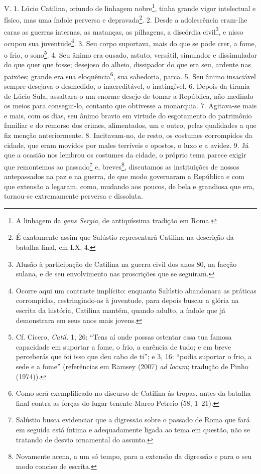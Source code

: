 V. 1. Lúcio Catilina, oriundo de linhagem nobre\footnote{A linhagem da
\emph{gens Sergia}, de antiquíssima tradição em Roma.}, tinha grande vigor
intelectual e físico, mas uma índole perversa e depravada\footnote{É exatamente
assim que Salústio representará Catilina na descrição da batalha final, em LX,
4.}. 2. Desde a adolescência eram-lhe caras as guerras internas, as matanças,
as pilhagens, a discórdia civil\footnote{Alusão à participação de Catilina na
guerra civil dos anos 80, na facção sulana, e de seu envolvimento nas
proscrições que se seguiram.}, e nisso ocupou sua juventude\footnote{Ocorre
aqui um contraste implícito: enquanto Salústio abandonara as práticas
corrompidas, restringindo-as à juventude, para depois buscar a glória na
escrita da história, Catilina mantém, quando adulto, a índole que já
demonstrara em seus anos mais jovens.}. 3. Seu corpo suportava, mais do que se
pode crer, a fome, o frio, o sono\footnote{Cf. Cícero, \emph{Catil.} 1,
26:  ``Tens aí onde possas ostentar essa tua famosa capacidade em suportar a
fome, o frio, a carência de tudo; e em breve perceberás que foi isso que deu
cabo de ti''; e 3, 16: ``podia suportar o frio, a sede e a fome'' (referências
em Ramsey (2007) \emph{ad locum}; tradução de Pinho (1974)).}. 4. Seu ânimo era
ousado, astuto, versátil, simulador e dissimulador do que quer que fosse;
desejoso do alheio, dissipador do que era seu, ardente nas paixões; grande era
sua eloquência\footnote{Como será exemplificado no
discurso de Catilina às tropas, antes da batalha final contra as forças do
lugar-tenente Marco Petreio (58, 1--21).}, sua sabedoria, parca. 5. Seu ânimo insaciável sempre
desejava o desmedido, o inacreditável, o inatingível. 6. Depois da tirania de
Lúcio Sula, assaltara-o um enorme desejo de tomar a República, não medindo os
meios para consegui-lo, contanto que obtivesse a monarquia. 7. Agitava-se mais
e mais, com os dias, seu ânimo bravio em virtude do esgotamento do patrimônio
familiar e do remorso dos crimes, alimentados, um e outro, pelas qualidades a
que fiz menção anteriormente. 8. Incitavam-no, de resto, os costumes
corrompidos da cidade, que eram movidos por males terríveis e opostos, o luxo e
a avidez. 9. Já que a ocasião nos lembrou os costumes da cidade, o próprio tema
parece exigir que remontemos ao passado\footnote{Salústio busca evidenciar que
a digressão sobre o passado de Roma que fará em seguida está íntima e
adequadamente ligada ao tema em questão, não se tratando de desvio ornamental
do assunto.} e, breves\footnote{Novamente acena, a um só tempo, para a extensão
da digressão e para o seu modo conciso de escrita.}, discutamos as instituições
de nossos antepassados na paz e na guerra, de que modo governaram a República e
com que extensão a legaram, como, mudando aos poucos, de bela e grandiosa que
era, tornou-se extremamente perversa e dissoluta.


